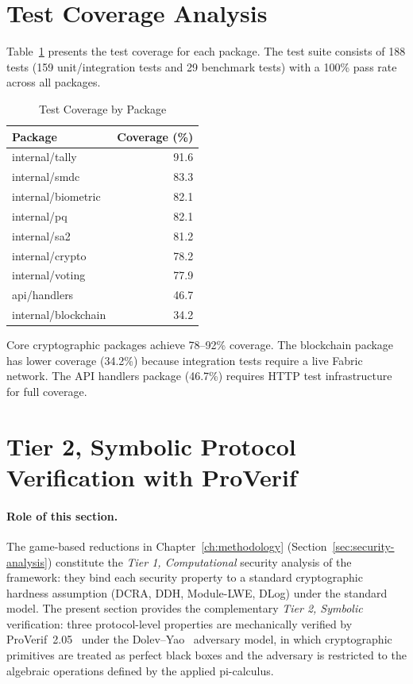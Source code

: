 \section{Test Coverage Analysis}
\label{sec:test-coverage}

Table~\ref{tab:coverage} presents the test coverage for each package. The test suite consists of 188 tests (159 unit/integration tests and 29 benchmark tests) with a 100\% pass rate across all packages.

\begin{table}[H]
\centering
\caption{Test Coverage by Package}
\label{tab:coverage}
\begin{tabular}{|l|r|}
\hline
\textbf{Package} & \textbf{Coverage (\%)} \\
\hline
internal/tally & 91.6 \\
\hline
internal/smdc & 83.3 \\
\hline
internal/biometric & 82.1 \\
\hline
internal/pq & 82.1 \\
\hline
internal/sa2 & 81.2 \\
\hline
internal/crypto & 78.2 \\
\hline
internal/voting & 77.9 \\
\hline
api/handlers & 46.7 \\
\hline
internal/blockchain & 34.2 \\
\hline
\end{tabular}
\end{table}

Core cryptographic packages achieve 78--92\% coverage. The blockchain package has lower coverage (34.2\%) because integration tests require a live Fabric network. The API handlers package (46.7\%) requires HTTP test infrastructure for full coverage.

\section{Tier 2, Symbolic Protocol Verification with ProVerif}
\label{sec:proverif}

\paragraph{Role of this section.} The game-based reductions in Chapter~\ref{ch:methodology} (Section~\ref{sec:security-analysis}) constitute the \emph{Tier 1, Computational} security analysis of the framework: they bind each security property to a standard cryptographic hardness assumption (DCRA, DDH, Module-LWE, DLog) under the standard model. The present section provides the complementary \emph{Tier 2, Symbolic} verification: three protocol-level properties are mechanically verified by ProVerif~2.05~\cite{blanchet2016} under the Dolev--Yao~\cite{dolev1983} adversary model, in which cryptographic primitives are treated as perfect black boxes and the adversary is restricted to the algebraic operations defined by the applied pi-calculus.

